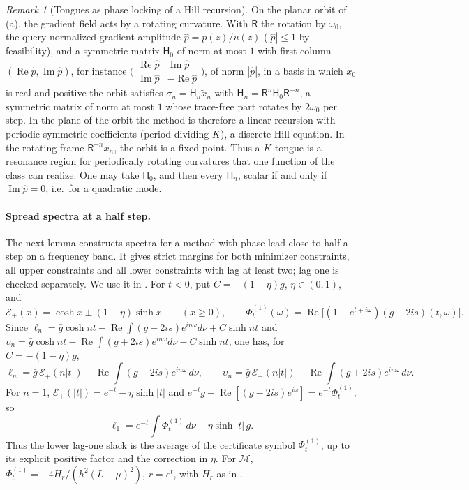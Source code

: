 \documentclass[11pt]{article}
\theoremstyle{definition}
\theoremstyle{remark}
\newtheorem{remark}[theorem]{Remark}
\newcommand{\cM}{\mathcal M}
\newcommand{\ch}{\cosh}
\newcommand{\sh}{\sinh}
\newcommand{\Rea}{\operatorname{Re}}
\newcommand{\Ima}{\operatorname{Im}}
\begin{document}
\begin{remark}[Tongues as phase locking of a Hill recursion]\label{rem:hill}
On the planar orbit of (a), the gradient field acts by a
rotating curvature.  With \(\mathsf R\) the rotation by \(\omega_0\), the
query-normalized gradient amplitude \(\hat p=p(z)/u(z)\)
(\(|\hat p|\le1\) by feasibility), and a
symmetric matrix \(\mathsf H_0\) of norm at most \(1\) with first column \((\Rea\hat p,\Ima\hat p)\), for
instance \(\bigl(\begin{smallmatrix}\Rea\hat p&\Ima\hat p\\\Ima\hat p&-\Rea\hat p\end{smallmatrix}\bigr)\), of norm \(|\hat p|\),
in a basis in which \(\tilde x_0\) is real and positive the orbit satisfies
\(\sigma_n=\mathsf H_n\tilde x_n\) with \(\mathsf H_n=\mathsf R^n\mathsf H_0\mathsf R^{-n}\), a symmetric matrix of
norm at most \(1\) whose trace-free part rotates by \(2\omega_0\) per step.  In the
plane of the orbit the method is therefore a linear recursion with
periodic symmetric coefficients (period dividing \(K\)), a discrete Hill
equation.  In the rotating frame \(\mathsf R^{-n}x_n\), the orbit is a fixed point.
Thus a \(K\)-tongue is a resonance region for periodically rotating curvatures
that one function of the class can realize.  One may take \(\mathsf H_0\), and then every
\(\mathsf H_n\), scalar if and only if \(\Ima\hat p=0\), i.e.\ for a quadratic mode.
\end{remark}

\paragraph{Spread spectra at a half step.}
The next lemma constructs spectra for a method with phase lead close to half a
step on a frequency band.  It gives strict margins for both minimizer constraints,
all upper constraints and all lower constraints with lag at least two;
lag one is checked separately.  We use it in .
For \(t<0\), put \(C=-(1-\eta)\bar g\), \(\eta\in(0,1)\), and
\[
\mathcal E_\pm(x)=\ch x\pm(1-\eta)\sh x\qquad(x\ge0),\qquad
\Phi^{(1)}_t(\omega)=\Rea\bigl[(1-e^{t+i\omega})(g-2is)(t,\omega)\bigr].
\]
Since \(\ell_n=\bar g\ch nt-\Rea\int(g-2is)e^{in\omega}d\nu+C\sh nt\) and
\(\upsilon_n=\bar g\ch nt-\Rea\int(g+2is)e^{in\omega}d\nu-C\sh nt\), one has, for
\(C=-(1-\eta)\bar g\),
\begin{equation}\label{eq:Epm}
\ell_n=\bar g\,\mathcal E_+(n|t|)-\Rea\int(g-2is)e^{in\omega}\,d\nu,\qquad
\upsilon_n=\bar g\,\mathcal E_-(n|t|)-\Rea\int(g+2is)e^{in\omega}\,d\nu .
\end{equation}
For \(n=1\), \(\mathcal E_+(|t|)=e^{-t}-\eta\sh|t|\) and \(e^{-t}g-\Rea[(g-2is)e^{i\omega}]=e^{-t}\Phi^{(1)}_t\), so
\begin{equation}\label{eq:l1extreme}
\ell_1=e^{-t}\int\Phi^{(1)}_t\,d\nu-\eta\sh|t|\,\bar g .
\end{equation}
Thus the lower lag-one slack is the average of the certificate symbol
\(\Phi^{(1)}_t\), up to its explicit positive factor and the correction in \(\eta\).  For \(\cM\), \(\Phi^{(1)}_t=-4H_r/(h^2(L-\mu)^2)\),
\(r=e^t\), with \(H_r\) as in .
\end{document}
